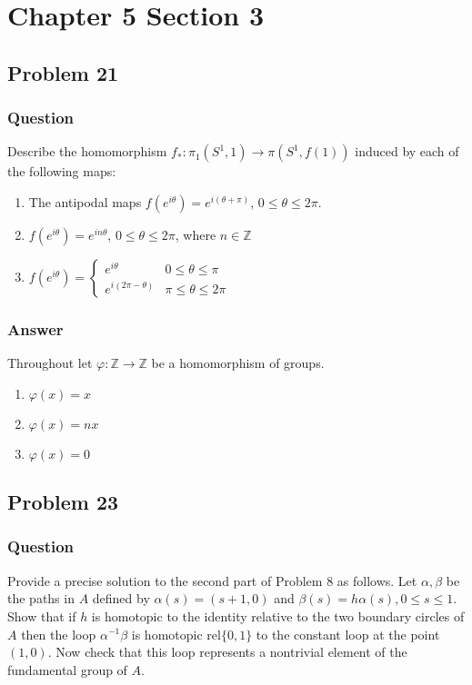 \documentclass[10pt]{article}
\begin{document}
\section{Chapter 5 Section 3}

\subsection{Problem 21}
\subsubsection{Question}
Describe the homomorphism $f_*: \pi_1(S^1,1) \to \pi(S^1,f(1))$ induced by each of the following maps:
\begin{enumerate}
\item The antipodal maps $f(e^{i \theta})=e^{i (\theta+\pi)}$, $0 \leq \theta \leq 2 \pi$.
\item $f(e^{i \theta})=e^{i n \theta}$, $0 \leq \theta \leq 2 \pi $, where $n \in \mathbb{Z}$
\item $\displaystyle f(e^{i \theta})= \left\{ \begin{array}{ll} e^{i \theta} & 0 \leq \theta \leq \pi \\ e^{i(2\pi - \theta)}&\pi \leq \theta \leq 2 \pi \end{array} \right.$
\end{enumerate}
\subsubsection{Answer}
Throughout let $\varphi: \mathbb{Z} \to \mathbb{Z}$ be a homomorphism of groups.
\begin{enumerate}
\item $\varphi(x)=x$
\item $\varphi(x)=nx$
\item $\varphi(x)=0$
\end{enumerate}

\subsection{Problem 23}
\subsubsection{Question}
Provide a precise solution to the second part of Problem 8 as follows. Let $\alpha, \beta$ be the paths in $A$ defined by $\alpha(s) = (s+1,0)$ and $\beta(s)=h \alpha(s), 0 \leq s \leq 1$. Show that if $h$ is homotopic to the identity relative to the two boundary circles of $A$ then the loop $\alpha^{-1}\beta$ is homotopic rel$\{0,1\}$ to the constant loop at the point $(1,0)$. Now check that this loop represents a nontrivial element of the fundamental group of $A$.
\end{document}
